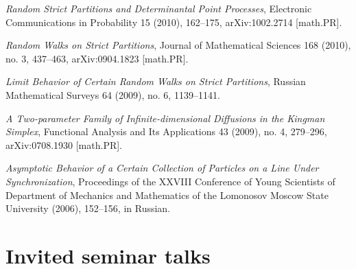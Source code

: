 \documentclass[letterpaper,11pt]{article}
\begin{document}
\begin{etaremune}
    \item \emph{Random Strict Partitions and Determinantal Point Processes}, Electronic Communications in Probability 15 (2010), 162--175, arXiv:1002.2714 [math.PR].
    \item  \emph{Random Walks on Strict Partitions}, Journal of Mathematical Sciences 168 (2010), no. 3, 437--463, arXiv:0904.1823 [math.PR].  
    \item  \emph{Limit Behavior of Certain Random Walks on Strict Partitions}, Russian Mathematical Surveys 64 (2009), no. 6, 1139--1141.
    \item  \emph{A Two-parameter Family of Infinite-dimensional Diffusions in the Kingman Simplex}, Functional Analysis and Its Applications 43 (2009), no. 4, 279--296, arXiv:0708.1930 [math.PR].
     \item 
    \emph{Asymptotic Behavior of a Certain Collection of Particles on a Line Under Synchronization}, Proceedings of the XXVIII Conference of Young Scientists of Department of Mechanics and Mathematics of the Lomonosov Moscow State University (2006), 152--156, in Russian.
\end{etaremune}



\section*{Invited seminar talks}
\end{document}
